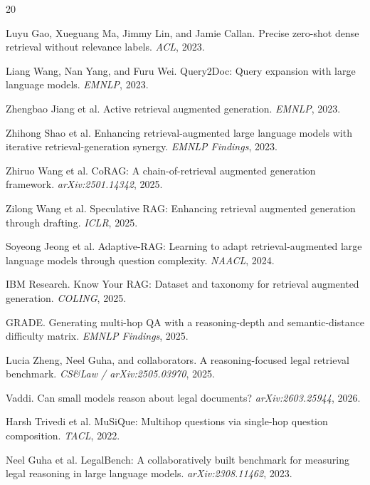\documentclass{article}
\begin{document}
{\small

\begin{thebibliography}{20}
\setlength{\itemsep}{0pt}
\setlength{\parskip}{0pt}

Luyu Gao, Xueguang Ma, Jimmy Lin, and Jamie Callan.
Precise zero-shot dense retrieval without relevance labels.
\emph{ACL}, 2023.

Liang Wang, Nan Yang, and Furu Wei.
Query2Doc: Query expansion with large language models.
\emph{EMNLP}, 2023.

Zhengbao Jiang et al.
Active retrieval augmented generation.
\emph{EMNLP}, 2023.

Zhihong Shao et al.
Enhancing retrieval-augmented large language models with iterative
retrieval-generation synergy.
\emph{EMNLP Findings}, 2023.

Zhiruo Wang et al.
CoRAG: A chain-of-retrieval augmented generation framework.
\emph{arXiv:2501.14342}, 2025.

Zilong Wang et al.
Speculative RAG: Enhancing retrieval augmented generation through drafting.
\emph{ICLR}, 2025.

Soyeong Jeong et al.
Adaptive-RAG: Learning to adapt retrieval-augmented large language models
through question complexity.
\emph{NAACL}, 2024.

IBM Research.
Know Your RAG: Dataset and taxonomy for retrieval augmented generation.
\emph{COLING}, 2025.

GRADE.
Generating multi-hop QA with a reasoning-depth and semantic-distance
difficulty matrix.
\emph{EMNLP Findings}, 2025.

Lucia Zheng, Neel Guha, and collaborators.
A reasoning-focused legal retrieval benchmark.
\emph{CS\&Law / arXiv:2505.03970}, 2025.

Vaddi.
Can small models reason about legal documents?
\emph{arXiv:2603.25944}, 2026.

Harsh Trivedi et al.
MuSiQue: Multihop questions via single-hop question composition.
\emph{TACL}, 2022.

Neel Guha et al.
LegalBench: A collaboratively built benchmark for measuring legal reasoning
in large language models.
\emph{arXiv:2308.11462}, 2023.

\end{thebibliography}
}
\end{document}
